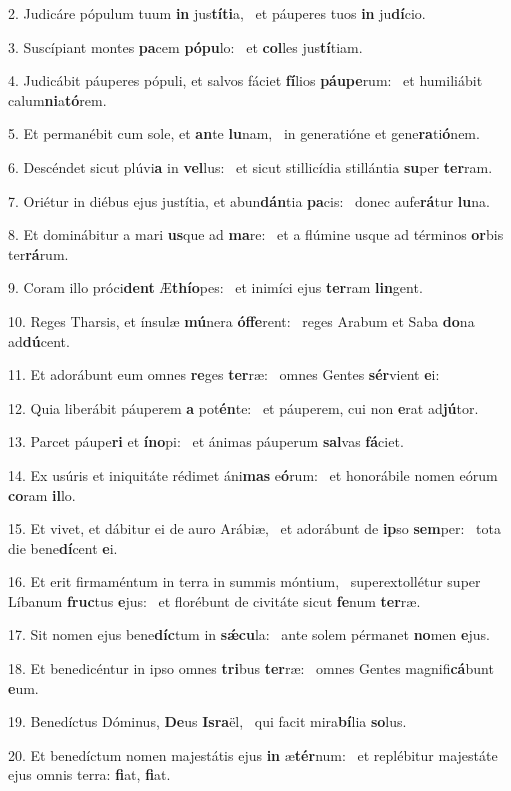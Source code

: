 2. Judicáre pópulum tuum \textbf{in} jus\textbf{tí}\textbf{ti}a, \ast\  et páuperes tuos \textbf{in} ju\textbf{dí}cio.\

3. Suscípiant montes \textbf{pa}cem \textbf{pó}\textbf{pu}lo: \ast\  et \textbf{col}les jus\textbf{tí}tiam.\

4. Judicábit páuperes pópuli, et salvos fáciet \textbf{fí}lios \textbf{páu}\textbf{pe}rum: \ast\  et humiliábit calum\textbf{ni}a\textbf{tó}rem.\

5. Et permanébit cum sole, et \textbf{an}te \textbf{lu}nam, \ast\  in generatióne et gene\textbf{ra}ti\textbf{ó}nem.\

6. Descéndet sicut plúvi\textbf{a} in \textbf{vel}lus: \ast\  et sicut stillicídia stillántia \textbf{su}per \textbf{ter}ram.\

7. Oriétur in diébus ejus justítia, et abun\textbf{dán}tia \textbf{pa}cis: \ast\  donec aufe\textbf{rá}tur \textbf{lu}na.\

8. Et dominábitur a mari \textbf{us}que ad \textbf{ma}re: \ast\  et a flúmine usque ad términos \textbf{or}bis ter\textbf{rá}rum.\

9. Coram illo próci\textbf{dent} Æ\textbf{thí}\textbf{o}pes: \ast\  et inimíci ejus \textbf{ter}ram \textbf{lin}gent.\

10. Reges Tharsis, et ínsulæ \textbf{mú}nera \textbf{óf}\textbf{fe}rent: \ast\  reges Arabum et Saba \textbf{do}na ad\textbf{dú}cent.\

11. Et adorábunt eum omnes \textbf{re}ges \textbf{ter}ræ: \ast\  omnes Gentes \textbf{sér}vient \textbf{e}i:\

12. Quia liberábit páuperem \textbf{a} pot\textbf{én}te: \ast\  et páuperem, cui non \textbf{e}rat ad\textbf{jú}tor.\

13. Parcet páupe\textbf{ri} et \textbf{ín}\textbf{o}pi: \ast\  et ánimas páuperum \textbf{sal}vas \textbf{fá}ciet.\

14. Ex usúris et iniquitáte rédimet áni\textbf{mas} e\textbf{ó}rum: \ast\  et honorábile nomen eórum \textbf{co}ram \textbf{il}lo.\

15. Et vivet, et dábitur ei de auro Arábiæ, \dag\  et adorábunt de \textbf{ip}so \textbf{sem}per: \ast\  tota die bene\textbf{dí}cent \textbf{e}i.\

16. Et erit firmaméntum in terra in summis móntium, \dag\  superextollétur super Líbanum \textbf{fruc}tus \textbf{e}jus: \ast\  et florébunt de civitáte sicut \textbf{fe}num \textbf{ter}ræ.\

17. Sit nomen ejus bene\textbf{díc}tum in \textbf{sǽ}\textbf{cu}la: \ast\  ante solem pérmanet \textbf{no}men \textbf{e}jus.\

18. Et benedicéntur in ipso omnes \textbf{tri}bus \textbf{ter}ræ: \ast\  omnes Gentes magnifi\textbf{cá}bunt \textbf{e}um.\

19. Benedíctus Dóminus, \textbf{De}us \textbf{Is}\textbf{ra}ël, \ast\  qui facit mira\textbf{bí}lia \textbf{so}lus.\

20. Et benedíctum nomen majestátis ejus \textbf{in} æ\textbf{tér}num: \ast\  et replébitur majestáte ejus omnis terra: \textbf{fi}at, \textbf{fi}at.\

